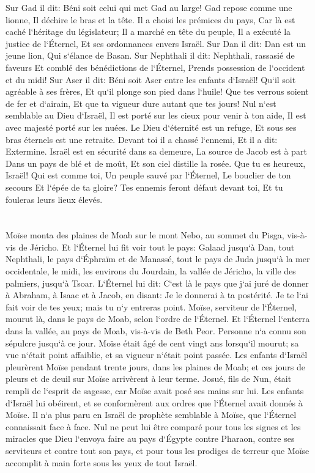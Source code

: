 \verse Sur Gad il dit: Béni soit celui qui met Gad au large! Gad repose comme une lionne, Il déchire le bras et la tête. 
\verse Il a choisi les prémices du pays, Car là est caché l`héritage du législateur; Il a marché en tête du peuple, Il a exécuté la justice de l`Éternel, Et ses ordonnances envers Israël. 
\verse Sur Dan il dit: Dan est un jeune lion, Qui s`élance de Basan. 
\verse Sur Nephthali il dit: Nephthali, rassasié de faveurs Et comblé des bénédictions de l`Éternel, Prends possession de l`occident et du midi! 
\verse Sur Aser il dit: Béni soit Aser entre les enfants d`Israël! Qu`il soit agréable à ses frères, Et qu`il plonge son pied dans l`huile! 
\verse Que tes verrous soient de fer et d`airain, Et que ta vigueur dure autant que tes jours! 
\verse Nul n`est semblable au Dieu d`Israël, Il est porté sur les cieux pour venir à ton aide, Il est avec majesté porté sur les nuées. 
\verse Le Dieu d`éternité est un refuge, Et sous ses bras éternels est une retraite. Devant toi il a chassé l`ennemi, Et il a dit: Extermine. 
\verse Israël est en sécurité dans sa demeure, La source de Jacob est à part Dans un pays de blé et de moût, Et son ciel distille la rosée. 
\verse Que tu es heureux, Israël! Qui est comme toi, Un peuple sauvé par l`Éternel, Le bouclier de ton secours Et l`épée de ta gloire? Tes ennemis feront défaut devant toi, Et tu fouleras leurs lieux élevés. 

\chapter{}

\verse Moïse monta des plaines de Moab sur le mont Nebo, au sommet du Pisga, vis-à-vis de Jéricho. Et l`Éternel lui fit voir tout le pays: 
\verse Galaad jusqu`à Dan, tout Nephthali, le pays d`Éphraïm et de Manassé, tout le pays de Juda jusqu`à la mer occidentale, 
\verse le midi, les environs du Jourdain, la vallée de Jéricho, la ville des palmiers, jusqu`à Tsoar. 
\verse L`Éternel lui dit: C`est là le pays que j`ai juré de donner à Abraham, à Isaac et à Jacob, en disant: Je le donnerai à ta postérité. Je te l`ai fait voir de tes yeux; mais tu n`y entreras point. 
\verse Moïse, serviteur de l`Éternel, mourut là, dans le pays de Moab, selon l`ordre de l`Éternel. 
\verse Et l`Éternel l`enterra dans la vallée, au pays de Moab, vis-à-vis de Beth Peor. Personne n`a connu son sépulcre jusqu`à ce jour. 
\verse Moïse était âgé de cent vingt ans lorsqu`il mourut; sa vue n`était point affaiblie, et sa vigueur n`était point passée. 
\verse Les enfants d`Israël pleurèrent Moïse pendant trente jours, dans les plaines de Moab; et ces jours de pleurs et de deuil sur Moïse arrivèrent à leur terme. 
\verse Josué, fils de Nun, était rempli de l`esprit de sagesse, car Moïse avait posé ses mains sur lui. Les enfants d`Israël lui obéirent, et se conformèrent aux ordres que l`Éternel avait donnés à Moïse. 
\verse Il n`a plus paru en Israël de prophète semblable à Moïse, que l`Éternel connaissait face à face. 
\verse Nul ne peut lui être comparé pour tous les signes et les miracles que Dieu l`envoya faire au pays d`Égypte contre Pharaon, contre ses serviteurs et contre tout son pays, 
\verse et pour tous les prodiges de terreur que Moïse accomplit à main forte sous les yeux de tout Israël. 
